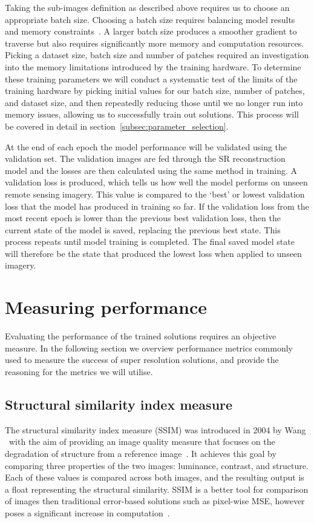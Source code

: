 Taking the sub-images definition as described above requires us to choose an appropriate batch size. Choosing a batch size requires balancing model results and memory constraints~\cite{batchSizeTest}. A larger batch size produces a smoother gradient to traverse but also requires significantly more memory and computation resources. Picking a dataset size, batch size and number of patches required an investigation into the memory limitations introduced by the training hardware. To determine these training parameters we will conduct a systematic test of the limits of the training hardware by picking initial values for our batch size, number of patches, and dataset size, and then repeatedly reducing those until we no longer run into memory issues, allowing us to successfully train out solutions. This process will be covered in detail in section~\ref{subsec:parameter_selection}.

At the end of each epoch the model performance will be validated using the validation set. The validation images are fed through the SR reconstruction model and the losses are then calculated using the same method in training. A validation loss is produced, which tells us how well the model performs on unseen remote sensing imagery. This value is compared to the `best' or lowest validation loss that the model has produced in training so far. If the validation loss from the most recent epoch is lower than the previous best validation loss, then the current state of the model is saved, replacing the previous best state. This process repeats until model training is completed. The final saved model state will therefore be the state that produced the lowest loss when applied to unseen imagery.

\section{Measuring performance}\label{sec:measuring_performance}
Evaluating the performance of the trained solutions requires an objective measure. In the following section we overview performance metrics commonly used to measure the success of super resolution solutions, and provide the reasoning for the metrics we will utilise.

\subsection{Structural similarity index measure}
The structural similarity index measure (SSIM) was introduced in 2004 by Wang \etal\ with the aim of providing an image quality measure that focuses on the degradation of structure from a reference image~\cite{ssim}. It achieves this goal by comparing three properties of the two images: luminance, contrast, and structure. Each of these values is compared across both images, and the resulting output is a float representing the structural similarity. SSIM is a better tool for comparison of images then traditional error-based solutions such as pixel-wise MSE, however poses a significant increase in computation~\cite{ssim}.

